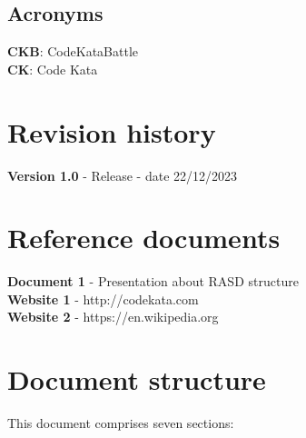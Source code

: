 \documentclass[12pt, a4paper]{report}
\begin{document}
    \subsection{Acronyms}
    \textbf{CKB}: CodeKataBattle 
    \\
    \textbf{CK}: Code Kata
    

    \section{Revision history}
    \textbf{Version 1.0} - Release - date 22/12/2023


    \section{Reference documents}
    \textbf{Document 1} - Presentation about RASD structure
    \\
    \textbf{Website 1} - http://codekata.com
    \\
    \textbf{Website 2} - https://en.wikipedia.org


    \section{Document structure}
    This document comprises seven sections:
\end{document}
